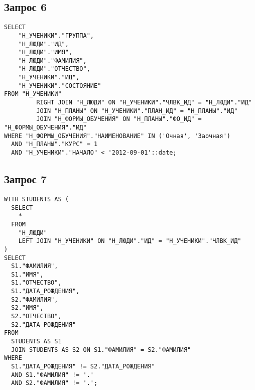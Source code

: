 \documentclass{article}
\begin{document}
\subsection{Запрос 6}
\begin{verbatim}
SELECT
    "Н_УЧЕНИКИ"."ГРУППА",
    "Н_ЛЮДИ"."ИД",
    "Н_ЛЮДИ"."ИМЯ",
    "Н_ЛЮДИ"."ФАМИЛИЯ",
    "Н_ЛЮДИ"."ОТЧЕСТВО",
    "Н_УЧЕНИКИ"."ИД",
    "Н_УЧЕНИКИ"."СОСТОЯНИЕ"
FROM "Н_УЧЕНИКИ"
         RIGHT JOIN "Н_ЛЮДИ" ON "Н_УЧЕНИКИ"."ЧЛВК_ИД" = "Н_ЛЮДИ"."ИД"
         JOIN "Н_ПЛАНЫ" ON "Н_УЧЕНИКИ"."ПЛАН_ИД" = "Н_ПЛАНЫ"."ИД"
         JOIN "Н_ФОРМЫ_ОБУЧЕНИЯ" ON "Н_ПЛАНЫ"."ФО_ИД" = "Н_ФОРМЫ_ОБУЧЕНИЯ"."ИД"
WHERE "Н_ФОРМЫ_ОБУЧЕНИЯ"."НАИМЕНОВАНИЕ" IN ('Очная', 'Заочная')
  AND "Н_ПЛАНЫ"."КУРС" = 1
  AND "Н_УЧЕНИКИ"."НАЧАЛО" < '2012-09-01'::date;
\end{verbatim}

\subsection{Запрос 7}
\begin{verbatim}
WITH STUDENTS AS (
  SELECT 
    * 
  FROM 
    "Н_ЛЮДИ" 
    LEFT JOIN "Н_УЧЕНИКИ" ON "Н_ЛЮДИ"."ИД" = "Н_УЧЕНИКИ"."ЧЛВК_ИД"
) 
SELECT 
  S1."ФАМИЛИЯ", 
  S1."ИМЯ", 
  S1."ОТЧЕСТВО", 
  S1."ДАТА_РОЖДЕНИЯ", 
  S2."ФАМИЛИЯ", 
  S2."ИМЯ", 
  S2."ОТЧЕСТВО", 
  S2."ДАТА_РОЖДЕНИЯ" 
FROM 
  STUDENTS AS S1 
  JOIN STUDENTS AS S2 ON S1."ФАМИЛИЯ" = S2."ФАМИЛИЯ" 
WHERE 
  S1."ДАТА_РОЖДЕНИЯ" != S2."ДАТА_РОЖДЕНИЯ" 
  AND S1."ФАМИЛИЯ" != '.' 
  AND S2."ФАМИЛИЯ" != '.';
\end{verbatim}
\end{document}
